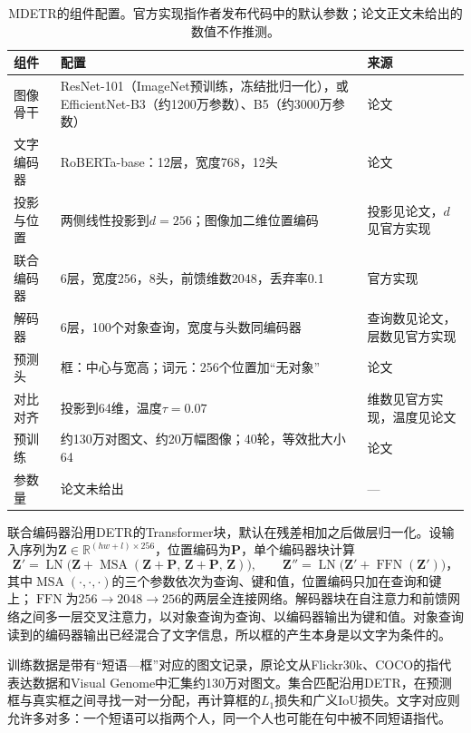 \begin{table}[htbp]
  \centering
  \small
  \begin{tabularx}{\linewidth}{@{}p{18mm}XX@{}}
    \toprule
    组件 & 配置 & 来源\\
    \midrule
    图像骨干 & ResNet-101（ImageNet预训练，冻结批归一化），或EfficientNet-B3（约1200万参数）、B5（约3000万参数） & 论文\\
    文字编码器 & RoBERTa-base：12层，宽度768，12头 & 论文\\
    投影与位置 & 两侧线性投影到$d=256$；图像加二维位置编码 & 投影见论文，$d$见官方实现\\
    联合编码器 & 6层，宽度256，8头，前馈维数2048，丢弃率0.1 & 官方实现\\
    解码器 & 6层，100个对象查询，宽度与头数同编码器 & 查询数见论文，层数见官方实现\\
    预测头 & 框：中心与宽高；词元：256个位置加“无对象” & 论文\\
    对比对齐 & 投影到64维，温度$\tau=0.07$ & 维数见官方实现，温度见论文\\
    预训练 & 约130万对图文、约20万幅图像；40轮，等效批大小64 & 论文\\
    参数量 & 论文未给出 & —\\
    \bottomrule
  \end{tabularx}
  \caption{MDETR的组件配置。官方实现指作者发布代码中的默认参数；论文正文未给出的数值不作推测。}
  \label{tab:vision-understanding-mdetr-config}
\end{table}

联合编码器沿用DETR的Transformer块，默认在残差相加之后做层归一化。设输入序列为$\bm Z\in\mathbb R^{(hw+l)\times256}$，位置编码为$\bm P$，单个编码器块计算
\[
  \bm Z'=\operatorname{LN}\bigl(\bm Z+\operatorname{MSA}(\bm Z+\bm P,\,\bm Z+\bm P,\,\bm Z)\bigr),\qquad
  \bm Z''=\operatorname{LN}\bigl(\bm Z'+\operatorname{FFN}(\bm Z')\bigr)\text{，}
\]
其中$\operatorname{MSA}(\cdot,\cdot,\cdot)$的三个参数依次为查询、键和值，位置编码只加在查询和键上；$\operatorname{FFN}$为$256\to2048\to256$的两层全连接网络。解码器块在自注意力和前馈网络之间多一层交叉注意力，以对象查询为查询、以编码器输出为键和值。对象查询读到的编码器输出已经混合了文字信息，所以框的产生本身是以文字为条件的。

训练数据是带有“短语—框”对应的图文记录，原论文从Flickr30k、COCO的指代表达数据和Visual Genome中汇集约130万对图文。集合匹配沿用DETR，在预测框与真实框之间寻找一对一分配，再计算框的$L_1$损失和广义IoU损失。文字对应则允许多对多：一个短语可以指两个人，同一个人也可能在句中被不同短语指代。

